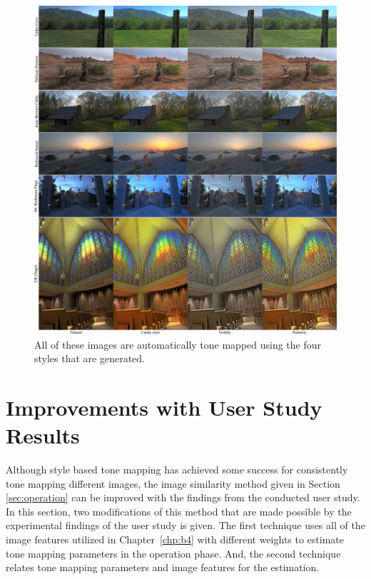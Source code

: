 \begin{figure}
\begin{center}
\includegraphics[width=\textwidth]{figures/chapter5/style_based/gallery_small.jpg}
\caption{All of these images are automatically tone mapped using the four styles that are generated.}
\label{fig:gallery}
\end{center}
\end{figure}

\section{Improvements with User Study Results}
Although style based tone mapping has achieved some success for consistently tone mapping different images, the image similarity method given in Section \ref{sec:operation} can be improved with the findings from the conducted user study. In this section, two modifications of this method that are made possible by the experimental findings of the user study is given. The first technique uses all of the image features utilized in Chapter~\ref{chp:b4} with different weights to estimate tone mapping parameters in the operation phase. And, the second technique relates tone mapping parameters and image features for the estimation.

